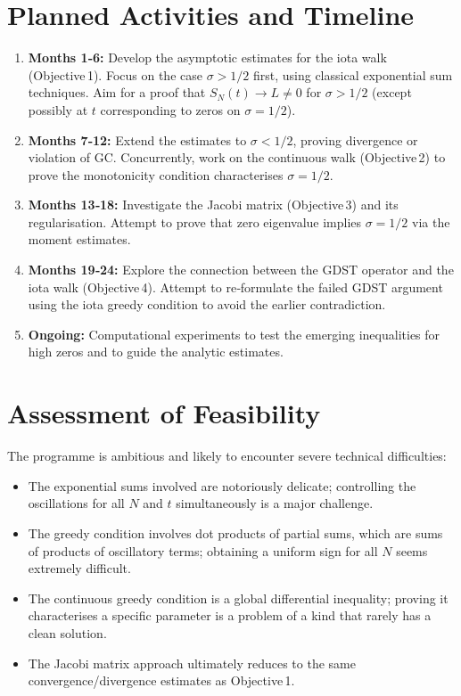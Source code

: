 \documentclass[11pt,a4paper]{article}
\begin{document}
\section{Planned Activities and Timeline}
\label{sec:timeline}

\begin{enumerate}[nosep]
    \item \textbf{Months 1‑6:} Develop the asymptotic estimates for the iota walk (Objective 1).  Focus on the case $\sigma>1/2$ first, using classical exponential sum techniques.  Aim for a proof that $S_N(t)\to L\neq0$ for $\sigma>1/2$ (except possibly at $t$ corresponding to zeros on $\sigma=1/2$).
    \item \textbf{Months 7‑12:} Extend the estimates to $\sigma<1/2$, proving divergence or violation of GC.  Concurrently, work on the continuous walk (Objective 2) to prove the monotonicity condition characterises $\sigma=1/2$.
    \item \textbf{Months 13‑18:} Investigate the Jacobi matrix (Objective 3) and its regularisation.  Attempt to prove that zero eigenvalue implies $\sigma=1/2$ via the moment estimates.
    \item \textbf{Months 19‑24:} Explore the connection between the GDST operator and the iota walk (Objective 4).  Attempt to re‑formulate the failed GDST argument using the iota greedy condition to avoid the earlier contradiction.
    \item \textbf{Ongoing:} Computational experiments to test the emerging inequalities for high zeros and to guide the analytic estimates.
\end{enumerate}

\section{Assessment of Feasibility}
\label{sec:feasibility}

The programme is ambitious and likely to encounter severe technical difficulties:

\begin{itemize}
    \item The exponential sums involved are notoriously delicate; controlling the oscillations for all $N$ and $t$ simultaneously is a major challenge.
    \item The greedy condition involves dot products of partial sums, which are sums of products of oscillatory terms; obtaining a uniform sign for all $N$ seems extremely difficult.
    \item The continuous greedy condition is a global differential inequality; proving it characterises a specific parameter is a problem of a kind that rarely has a clean solution.
    \item The Jacobi matrix approach ultimately reduces to the same convergence/divergence estimates as Objective 1.
\end{itemize}
\end{document}
